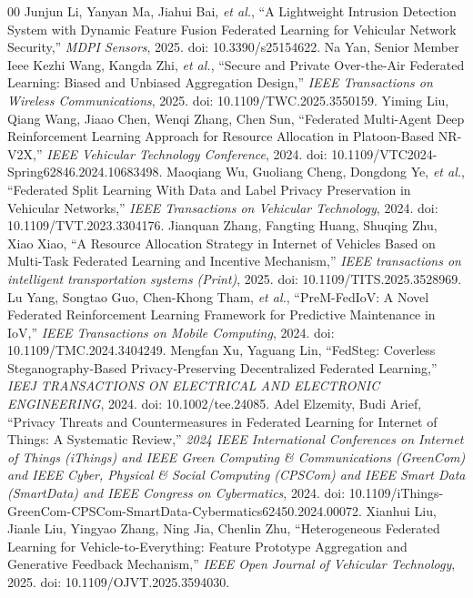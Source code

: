 \documentclass[journal]{IEEEtran}
\begin{document}
\begin{thebibliography}{00}
 Junjun Li, Yanyan Ma, Jiahui Bai, \emph{et al.}, ``A Lightweight Intrusion Detection System with Dynamic Feature Fusion Federated Learning for Vehicular Network Security,'' \emph{MDPI Sensors}, 2025. doi: 10.3390/s25154622.
 Na Yan, Senior Member Ieee Kezhi Wang, Kangda Zhi, \emph{et al.}, ``Secure and Private Over-the-Air Federated Learning: Biased and Unbiased Aggregation Design,'' \emph{IEEE Transactions on Wireless Communications}, 2025. doi: 10.1109/TWC.2025.3550159.
 Yiming Liu, Qiang Wang, Jiaao Chen, Wenqi Zhang, Chen Sun, ``Federated Multi-Agent Deep Reinforcement Learning Approach for Resource Allocation in Platoon-Based NR-V2X,'' \emph{IEEE Vehicular Technology Conference}, 2024. doi: 10.1109/VTC2024-Spring62846.2024.10683498.
 Maoqiang Wu, Guoliang Cheng, Dongdong Ye, \emph{et al.}, ``Federated Split Learning With Data and Label Privacy Preservation in Vehicular Networks,'' \emph{IEEE Transactions on Vehicular Technology}, 2024. doi: 10.1109/TVT.2023.3304176.
 Jianquan Zhang, Fangting Huang, Shuqing Zhu, Xiao Xiao, ``A Resource Allocation Strategy in Internet of Vehicles Based on Multi-Task Federated Learning and Incentive Mechanism,'' \emph{IEEE transactions on intelligent transportation systems (Print)}, 2025. doi: 10.1109/TITS.2025.3528969.
 Lu Yang, Songtao Guo, Chen-Khong Tham, \emph{et al.}, ``PreM-FedIoV: A Novel Federated Reinforcement Learning Framework for Predictive Maintenance in IoV,'' \emph{IEEE Transactions on Mobile Computing}, 2024. doi: 10.1109/TMC.2024.3404249.
 Mengfan Xu, Yaguang Lin, ``FedSteg: Coverless Steganography‐Based Privacy‐Preserving Decentralized Federated Learning,'' \emph{IEEJ TRANSACTIONS ON ELECTRICAL AND ELECTRONIC ENGINEERING}, 2024. doi: 10.1002/tee.24085.
 Adel Elzemity, Budi Arief, ``Privacy Threats and Countermeasures in Federated Learning for Internet of Things: A Systematic Review,'' \emph{2024 IEEE International Conferences on Internet of Things (iThings) and IEEE Green Computing & Communications (GreenCom) and IEEE Cyber, Physical & Social Computing (CPSCom) and IEEE Smart Data (SmartData) and IEEE Congress on Cybermatics}, 2024. doi: 10.1109/iThings-GreenCom-CPSCom-SmartData-Cybermatics62450.2024.00072.
 Xianhui Liu, Jianle Liu, Yingyao Zhang, Ning Jia, Chenlin Zhu, ``Heterogeneous Federated Learning for Vehicle-to-Everything: Feature Prototype Aggregation and Generative Feedback Mechanism,'' \emph{IEEE Open Journal of Vehicular Technology}, 2025. doi: 10.1109/OJVT.2025.3594030.

\end{thebibliography}
\end{document}
